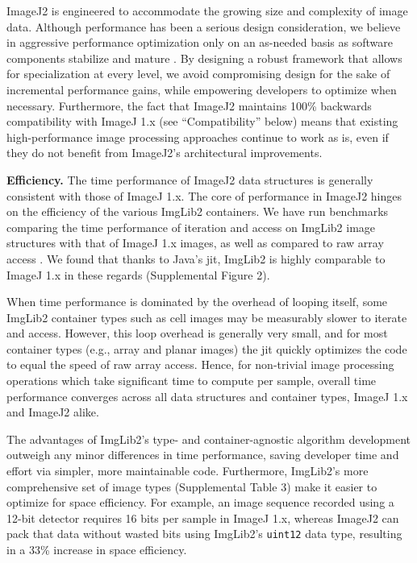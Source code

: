 \documentclass{bmcart}
\begin{document}
ImageJ2 is engineered to accommodate the growing size and complexity of image
data. Although performance has been a serious design consideration, we believe
in aggressive performance optimization only on an as-needed basis as software
components stabilize and mature \cite{premature_optimization}. By designing a
robust framework that allows for specialization at every level, we avoid
compromising design for the sake of incremental performance gains, while
empowering developers to optimize when necessary. Furthermore, the fact that
ImageJ2 maintains 100\% backwards compatibility with ImageJ 1.x (see
``Compatibility'' below) means that existing high-performance image processing
approaches continue to work as is, even if they do not benefit from ImageJ2's
architectural improvements.

\textbf{Efficiency.} The time performance of ImageJ2 data structures is
generally consistent with those of ImageJ 1.x. The core of performance in
ImageJ2 hinges on the efficiency of the various ImgLib2 containers. We have run
benchmarks comparing the time performance of iteration and access on ImgLib2
image structures with that of ImageJ 1.x images, as well as compared to raw
array access \cite{imglib2_benchmarks}. We found that thanks to Java's
\acrfull{jit}, ImgLib2 is highly comparable to ImageJ 1.x in these regards
(Supplemental Figure 2).

When time performance is dominated by the overhead of looping itself, some
ImgLib2 container types such as cell images may be measurably slower to iterate
and access. However, this loop overhead is generally very small, and for most
container types (e.g., array and planar images) the \acrshort{jit} quickly
optimizes the code to equal the speed of raw array access. Hence, for
non-trivial image processing operations which take significant time to compute
per sample, overall time performance converges across all data structures and
container types, ImageJ 1.x and ImageJ2 alike.

The advantages of ImgLib2's type- and container-agnostic algorithm development
outweigh any minor differences in time performance, saving developer time and
effort via simpler, more maintainable code. Furthermore, ImgLib2's more
comprehensive set of image types (Supplemental Table 3) make it easier to
optimize for space efficiency. For example, an image sequence recorded using a
12-bit detector requires 16 bits per sample in ImageJ 1.x, whereas ImageJ2 can
pack that data without wasted bits using ImgLib2's \texttt{uint12} data type,
resulting in a 33\% increase in space efficiency.
\end{document}
